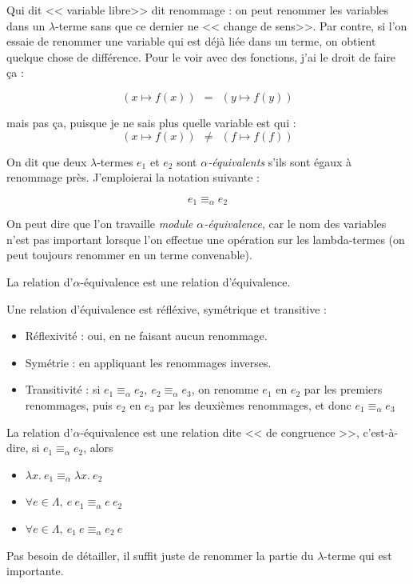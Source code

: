 \documentclass[11pt]{article}
\begin{document}
Qui dit << variable libre>> dit renommage : on peut renommer les variables dans un $\lambda$-terme sans que ce dernier ne << change de sens>>. Par contre, si l'on essaie de renommer une variable qui est déjà liée dans un terme, on obtient quelque chose de différence. Pour le voir avec des fonctions, j'ai le droit de faire ça :

$$(x\mapsto f(x))~~=~~(y\mapsto f(y))$$

mais pas ça, puisque je ne sais plus quelle variable est qui :
$$(x\mapsto f(x))~~\ne~~(f\mapsto f(f))$$

\begin{definition}
    On dit que deux $\lambda$-termes $e_1$ et $e_2$ sont \textit{$\alpha$-équivalents} s'ils sont égaux à renommage près. J'emploierai la notation suivante :
    
    $$e_1 \equiv_\alpha e_2$$
    
    On peut dire que l'on travaille \textit{module $\alpha$-équivalence}, car le nom des variables n'est pas important lorsque l'on effectue une opération sur les lambda-termes (on peut toujours renommer en un terme convenable).
\end{definition}

\begin{theorem}
    La relation d'$\alpha$-équivalence est une relation d'équivalence.

    \begin{preuve}
    Une relation d'équivalence est réfléxive, symétrique et transitive :
    \begin{itemize}
        \item Réflexivité : oui, en ne faisant aucun renommage.
        \item Symétrie : en appliquant les renommages inverses.
        \item Transitivité : si $e_1 \equiv_\alpha e_2,~e_2 \equiv_\alpha e_3$, on renomme $e_1$ en $e_2$ par les premiers renommages, puis $e_2$ en $e_3$ par les deuxièmes renommages, et donc $e_1 \equiv_\alpha e_3$
    \end{itemize}
    \end{preuve}
\end{theorem}

\begin{theorem}
    La relation d'$\alpha$-équivalence est une relation dite << de congruence >>, c'est-à-dire, si $e_1 \equiv_\alpha e_2$, alors
    \begin{itemize}
        \item $\lambda x.~e_1 \equiv_\alpha \lambda x.~e_2$
        \item $\forall e\in\Lambda, ~ e~e_1 \equiv_\alpha e~ e_2$
        \item $\forall e\in\Lambda, ~ e_1~e \equiv_\alpha e_2~e$
    \end{itemize}

    \begin{preuve}
    Pas besoin de détailler, il suffit juste de renommer la partie du $\lambda$-terme qui est importante.
    \end{preuve}
\end{theorem}
\end{document}
